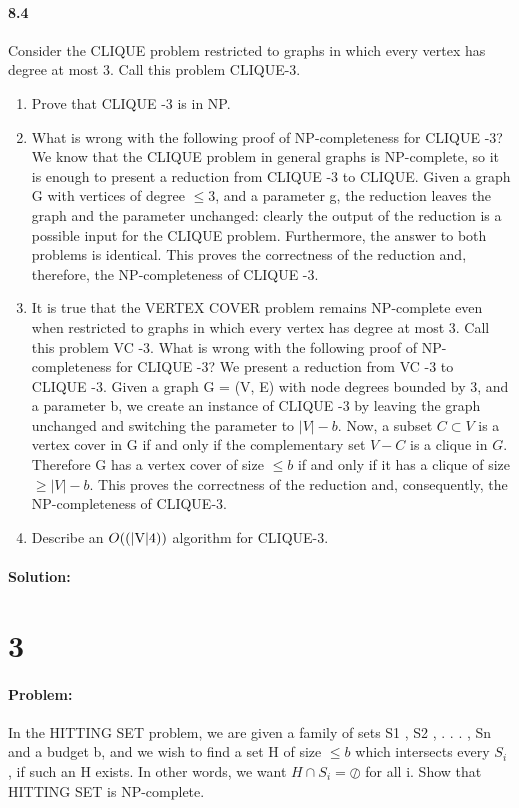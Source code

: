 \documentclass[12pt]{article}
\newcommand{\BigO}[1]{\ensuremath{O(#1)}}
\begin{document}
\paragraph{8.4}
Consider the CLIQUE problem restricted to graphs in which every vertex has degree at most 3.
Call this problem CLIQUE-3.
\begin{enumerate}
\item Prove that CLIQUE -3 is in NP.
\item What is wrong with the following proof of NP-completeness for CLIQUE -3?
        We know that the CLIQUE problem in general graphs is NP-complete, so it is enough to
        present a reduction from CLIQUE -3 to CLIQUE. Given a graph G with
        vertices of degree $\le 3$, and a parameter g, the reduction
        leaves the graph and the parameter unchanged: clearly the output
        of the reduction is a possible input for the CLIQUE problem.
        Furthermore, the answer to both problems is identical. This
        proves the correctness of the reduction and, therefore, the
        NP-completeness of CLIQUE -3.
\item It is true that the VERTEX COVER problem remains NP-complete even when restricted to
    graphs in which every vertex has degree at most 3. Call this problem
    VC -3. What is wrong with the following proof of NP-completeness for
    CLIQUE -3?  We present a reduction from VC -3 to CLIQUE -3. Given a
    graph G = (V, E) with node degrees bounded by 3, and a parameter b,
    we create an instance of CLIQUE -3 by leaving the graph unchanged
    and switching the parameter to $|V| - b$. Now, a subset $C \subset
    V$ is a vertex cover in G if and only if the complementary set $V -
    C$ is a clique in $G$. Therefore G has a vertex cover of size $\le
    b$ if and only if it has a clique of size $\ge |V| - b$. This proves
    the correctness of the reduction and, consequently, the
    NP-completeness of CLIQUE-3.
\item Describe an \BigO{$(|V|4)$} algorithm for CLIQUE-3.
\end{enumerate}

\paragraph{Solution:}

\section*{3}
\paragraph{Problem:}
In the HITTING SET problem, we are given a family of sets {S1 , S2 , . . . , Sn } and a budget b, and
we wish to find a set H of size $\le b$ which intersects every $S_i$ , if such an H exists. In other words,
we want $H \cap S_i = \oslash$ for all i.
Show that
HITTING SET
is NP-complete.
\end{document}
